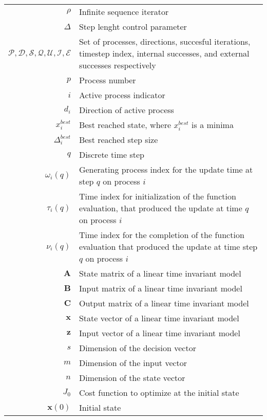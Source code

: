 \begin{scriptsize}
\begin{tabularx}{\textwidth}{r|X}
	$\rho$																& Infinite sequence iterator\\
	$\Delta$													& Step lenght control parameter\\
	$\mathcal{P},\mathcal{D},\mathcal{S},\mathcal{Q},\mathcal{U},\mathcal{I},\mathcal{E}$ & Set of processes, directions, succesful iterations, timestep index, internal successes, and external successes respectively\\
	$p$																& Process number\\
	$i$																& Active process indicator\\
	$d_i$															& Direction of active process\\
	$x_i^{best}$											& Best reached state, where $x_i^{best}$ is a minima\\
	$\Delta_i^{best}$											& Best reached step size\\
	$q$																& Discrete time step\\
	$\omega_i(q)$ 										& Generating process index for the update time at step $q$ on process $i$\\
	$\tau_i(q)$												& Time index for initialization of the function evaluation, that produced the update at time $q$ on process $i$\\
	$\nu_i(q)$ 												& Time index for the completion of the function evaluation that produced the update at time step $q$ on process $i$\\



	$\textbf{A}$																& State matrix of a linear time invariant model\\
	$\textbf{B}$																& Input matrix of a linear time invariant model\\
	$\textbf{C}$																& Output matrix of a linear time invariant model\\
	$\textbf{x}$											& State vector of a linear time invariant model\\
	$\textbf{z}$											& Input vector of a linear time invariant model\\
$s$                             & Dimension of the decision vector\\
$m$                             & Dimension of the input vector\\
$n$                             & Dimension of the state vector\\
$J_0$                           & Cost function to optimize at the initial state\\
$\textbf{x}(0)$                 & Initial state\\


\end{tabularx}
\end{scriptsize}
